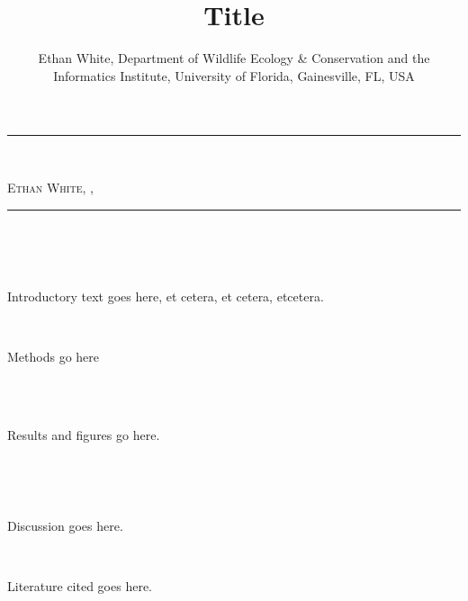 \documentclass{beamer}
\author{Ethan White, Department of Wildlife Ecology \& Conservation and the Informatics Institute, University of Florida, Gainesville, FL, USA}
\title[17pt]{Title}
\date{}
\begin{document}
\begin{center} 
\begin{Huge}
\rule{\linewidth}{0.25cm}
\textsc{%
\color{UFOrange}{Really Awesome Poster Title}}\\
 
\end{Huge}  
\begin{large} 
\textsc{Ethan White}, \color{UFOrange}{Department of Wildlife Ecology \& Conservation and the Informatics Institute, University of Florida, Gainesville, FL, USA}, \color{UFBlue}{@ethanwhite}\\
\end{large}
\end{center}
\begin{center}
\rule{\linewidth}{0.3cm}
\begin{minipage}{0.25\linewidth}
\begin{Large}
\vspace{0.5cm}
~\\
~\\
\textsc{\color{UFOrange}{Summary}}\\
\end{Large}
Introductory text goes here, et cetera, et cetera, etcetera.\\


\begin{Large}
\textsc{\color{UFOrange}{Methods}}\\
\end{Large}
Methods go here\\
~\\
\end{minipage}
\hspace{1cm}
\begin{minipage}{0.42\linewidth}
\vspace{0.5cm}
\begin{center}
\begin{huge}
\textsc{\color{UFOrange}{Results}\\}
\end{huge}
\end{center}
Results and figures go here.\\
\end{minipage}
\hspace{1cm}
\begin{minipage}{0.25\linewidth}
\vspace{0.5cm}
~\\
\begin{Large}
\textsc{\color{UFOrange}{Discussion}}\\
\end{Large}
Discussion goes here.\\

\begin{Large}
\textsc{\color{UFOrange}{Literature Cited}}\\
\end{Large}
Literature cited goes here.
\end{minipage}
\end{center}
\end{document}
